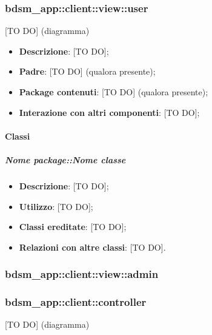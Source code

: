 	\subsubsection{bdsm\_app::client::view::user} %
	\label{ssub:bdsm_app_client_view_user}
	[TO DO] (diagramma) \newline \newline

	\begin{itemize}
		\item \textbf{Descrizione}: [TO DO];
		\item \textbf{Padre}: [TO DO] (qualora presente);
		\item \textbf{Package contenuti}: [TO DO] (qualora presente);
		\item \textbf{Interazione con altri componenti}: [TO DO];
	\end{itemize}

		\paragraph{Classi} %
			\subparagraph{Nome package::Nome classe} %
			\label{subp:subparagraph_name}
				\begin{itemize}
					\item \textbf{Descrizione}: [TO DO];
					\item \textbf{Utilizzo}: [TO DO];
					\item \textbf{Classi ereditate}: [TO DO];
					\item \textbf{Relazioni con altre classi}: [TO DO].
				\end{itemize}

	\subsubsection{bdsm\_app::client::view::admin} %
	\label{ssub:bdsm_app_client_view_admin}
	



	\subsubsection{bdsm\_app::client::controller} %
	\label{ssub:bdsm_app_client_controller}
	[TO DO] (diagramma) \newline \newline


